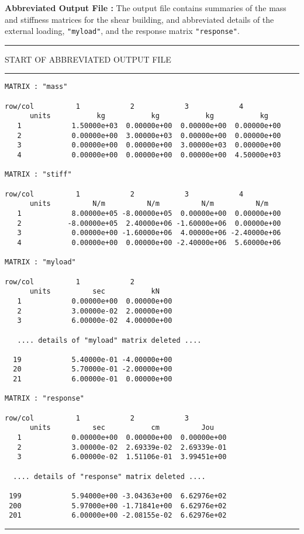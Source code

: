\vspace{0.15 in}\noindent
{\bf Abbreviated Output File :}
The output file contains summaries of the mass and stiffness matrices for the shear building,
and abbreviated details of the external loading, {\tt "myload"},
and the response matrix {\tt "response"}.

\vspace{0.15 truein}
\begin{footnotesize}
\noindent
{\rule{1.7 in}{0.035 in} START OF ABBREVIATED OUTPUT FILE \rule{1.7 in}{0.035 in} }
\begin{verbatim}
MATRIX : "mass"

row/col          1            2            3            4          
      units           kg           kg           kg           kg   
   1            1.50000e+03  0.00000e+00  0.00000e+00  0.00000e+00
   2            0.00000e+00  3.00000e+03  0.00000e+00  0.00000e+00
   3            0.00000e+00  0.00000e+00  3.00000e+03  0.00000e+00
   4            0.00000e+00  0.00000e+00  0.00000e+00  4.50000e+03

MATRIX : "stiff"

row/col          1            2            3            4          
      units          N/m          N/m          N/m          N/m   
   1            8.00000e+05 -8.00000e+05  0.00000e+00  0.00000e+00
   2           -8.00000e+05  2.40000e+06 -1.60000e+06  0.00000e+00
   3            0.00000e+00 -1.60000e+06  4.00000e+06 -2.40000e+06
   4            0.00000e+00  0.00000e+00 -2.40000e+06  5.60000e+06

MATRIX : "myload"

row/col          1            2          
      units          sec           kN   
   1            0.00000e+00  0.00000e+00
   2            3.00000e-02  2.00000e+00
   3            6.00000e-02  4.00000e+00

   .... details of "myload" matrix deleted ....

  19            5.40000e-01 -4.00000e+00
  20            5.70000e-01 -2.00000e+00
  21            6.00000e-01  0.00000e+00

MATRIX : "response"

row/col          1            2            3          
      units          sec           cm          Jou   
   1            0.00000e+00  0.00000e+00  0.00000e+00
   2            3.00000e-02  2.69339e-02  2.69339e-01
   3            6.00000e-02  1.51106e-01  3.99451e+00

  .... details of "response" matrix deleted ....

 199            5.94000e+00 -3.04363e+00  6.62976e+02
 200            5.97000e+00 -1.71841e+00  6.62976e+02
 201            6.00000e+00 -2.08155e-02  6.62976e+02
\end{verbatim}
\rule{6.25 in}{0.035 in}
\end{footnotesize}

